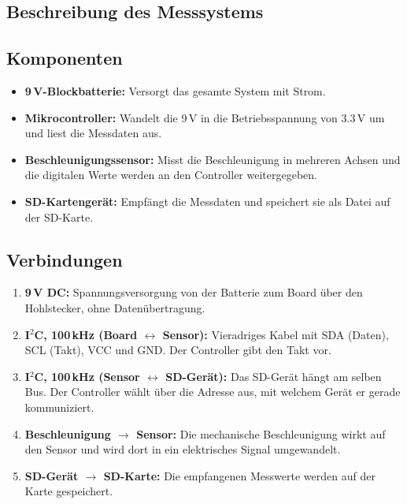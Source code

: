 \documentclass[a4paper,oneside,10pt]{article}%
\begin{document}
\subsection{Beschreibung des Messsystems}
\subsection*{Komponenten}
\begin{itemize}
  \item \textbf{9\,V-Blockbatterie:} Versorgt das gesamte System mit
  Strom.

  \item \textbf{Mikrocontroller:} Wandelt die 9\,V in die Betriebsspannung von 3.3\,V um und liest die Messdaten aus.

  \item \textbf{Beschleunigungssensor:} Misst die Beschleunigung in mehreren Achsen und die digitalen Werte werden an den Controller weitergegeben.

  \item \textbf{SD-Kartengerät:} Empfängt die Messdaten und speichert sie als Datei auf der SD-Karte.
\end{itemize}

\subsection*{Verbindungen}
\begin{enumerate}
  \item[(1)] \textbf{9\,V DC:} Spannungsversorgung von der Batterie zum Board über den Hohlstecker, ohne Datenübertragung.

  \item[(2)] \textbf{I$^2$C, 100\,kHz (Board $\leftrightarrow$ Sensor):}
  Vieradriges Kabel mit SDA (Daten), SCL (Takt), VCC und GND. Der Controller
  gibt den Takt vor.

  \item[(3)] \textbf{I$^2$C, 100\,kHz (Sensor $\leftrightarrow$ SD-Gerät):}
  Das SD-Gerät hängt am selben Bus. Der Controller wählt über die Adresse aus, mit welchem Gerät er gerade kommuniziert.

  \item[(4)] \textbf{Beschleunigung $\rightarrow$ Sensor:} Die mechanische
  Beschleunigung wirkt auf den Sensor und wird dort in ein elektrisches
  Signal umgewandelt.

  \item[(5)] \textbf{SD-Gerät $\rightarrow$ SD-Karte:} Die empfangenen Messwerte werden auf der Karte gespeichert.
\end{enumerate}
\end{document}
